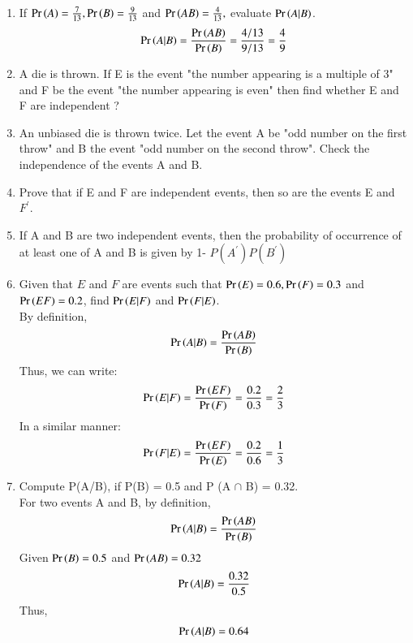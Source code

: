\begin{enumerate}[label=\thesection.\arabic*.,ref=\thesection.\theenumi]
\item If $\Pr\left(A\right)= \frac{7}{13}, \Pr\left(B\right)=\frac{9}{13}$ and $\Pr\left(AB\right)=\frac{4}{13},$ evaluate $\Pr\left(A|B\right)$.
\\
\solution 
\begin{align}
\Pr\left(A|B\right) = \frac{\Pr\left(AB\right)}{\Pr\left(B\right)} = \frac{4/13}{9/13} = \frac{4}{9}
\end{align}
\item A die is thrown. If E is the event "the number appearing is a multiple of 3" and F be the event "the number appearing is even" then find whether E and F are independent ?\\

\item An unbiased die is thrown twice. Let the event A be "odd number on the first throw" and B the event "odd number on the second throw". Check the independence of the events A and B.\\
\solution



\item Prove that if E and F are independent events, then so are the events E and $F^{'}$.\\
\solution


\item If A and B are two independent events, then the probability of occurrence of at least one of A and B is given by 1- $P(A^{'}) P(B^{'})$\\
\solution

\item Given that $E$ and $F$ are events such that $\Pr\left(E\right) = 0.6, \Pr\left(F\right) = 0.3$ and $\Pr\left(EF\right) = 0.2$, find $\Pr\left(E|F\right)$ and $\Pr\left(F|E\right)$.\\
\solution
By definition, 
\begin{align}
\Pr\left(A|B\right) = \frac{\Pr\left(AB\right)}{\Pr\left(B\right)}
\end{align}
Thus, we can write:
\begin{align}
\Pr\left(E|F\right) = \frac{\Pr\left(EF\right)}{\Pr\left(F\right)} = \frac{0.2}{0.3} = \frac{2}{3}
\end{align}
In a similar manner:
\begin{align}
\Pr\left(F|E\right) = \frac{\Pr\left(EF\right)}{\Pr\left(E\right)} = \frac{0.2}{0.6} = \frac{1}{3}
\end{align}
%
\item Compute P(A/B), if P(B) = 0.5 and P (A $\cap$ B) = 0.32.\\
\solution
For two events A and B, by definition,
\begin{align}
\Pr\left(A|B\right) = \frac{\Pr\left(AB\right)}{\Pr\left(B\right)}
\end{align}
Given $\Pr\left(B\right) = 0.5$ and $\Pr\left(AB\right) = 0.32$
\begin{align}
\Pr\left(A | B\right) = \frac{0.32}{0.5}
\end{align}
Thus,
\begin{align}
\Pr\left(A | B\right) = 0.64
\end{align}


\end{enumerate}
